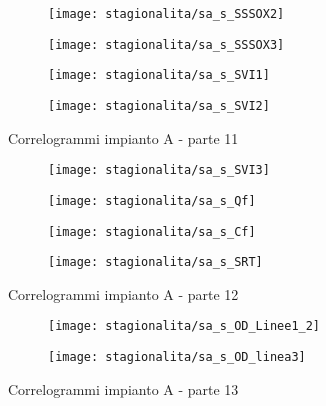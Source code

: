 \begin{sidewaysfigure}[h]\ContinuedFloat
	\renewcommand*\thesubfigure{(\arabic{subfigure})}
	\begin{subfigure}{0.49\textwidth}
		\texttt{[image: stagionalita/sa\_s\_SSSOX2]}
		\caption{}
		\label{fig:sa_s_SSSOX2}
		\centering
	\end{subfigure}
	\begin{subfigure}{0.49\textwidth}
		\texttt{[image: stagionalita/sa\_s\_SSSOX3]}
		\caption{}
		\label{fig:sa_s_SSSOX3}
		\centering
	\end{subfigure}

	\begin{subfigure}{0.49\textwidth}
		\texttt{[image: stagionalita/sa\_s\_SVI1]}
		\caption{}
		\label{fig:sa_s_SVI1}
		\centering
	\end{subfigure}
	\begin{subfigure}{0.49\textwidth}
		\texttt{[image: stagionalita/sa\_s\_SVI2]}	
		\caption{}
		\label{fig:sa_s_SVI2}
		\centering
	\end{subfigure}
	\caption{Correlogrammi impianto A - parte 11}
\end{sidewaysfigure}

\begin{sidewaysfigure}[h]\ContinuedFloat
	\renewcommand*\thesubfigure{(\arabic{subfigure})}
	\begin{subfigure}{0.49\textwidth}
		\texttt{[image: stagionalita/sa\_s\_SVI3]}
		\caption{}
		\centering
	\end{subfigure}
	\begin{subfigure}{0.49\textwidth}
		\texttt{[image: stagionalita/sa\_s\_Qf]}
		\caption{}
		\centering
	\end{subfigure}

	\begin{subfigure}{0.49\textwidth}
		\texttt{[image: stagionalita/sa\_s\_Cf]}
		\caption{}
		\centering
	\end{subfigure}
	\begin{subfigure}{0.49\textwidth}
		\texttt{[image: stagionalita/sa\_s\_SRT]}
		\caption{}
		\centering
	\end{subfigure}
	\caption{Correlogrammi impianto A - parte 12}
\end{sidewaysfigure}

\begin{sidewaysfigure}[h]\ContinuedFloat
	\renewcommand*\thesubfigure{(\arabic{subfigure})}
	\begin{subfigure}{0.49\textwidth}
		\texttt{[image: stagionalita/sa\_s\_OD\_Linee1\_2]}
		\caption{}
		\centering
	\end{subfigure}
	\begin{subfigure}{0.49\textwidth}
		\texttt{[image: stagionalita/sa\_s\_OD\_linea3]}
		\caption{}
		\centering
	\end{subfigure}
	\caption{Correlogrammi impianto A - parte 13}
\end{sidewaysfigure}

